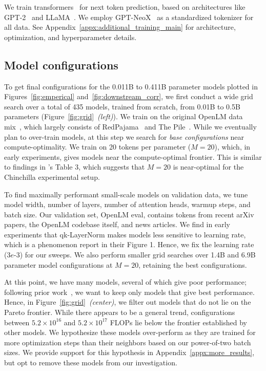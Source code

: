 We train transformers~\cite{transformer} for next token prediction, based on architectures like GPT-2~\cite{Radford2019LanguageMA} and LLaMA~\cite{llama}.
We employ GPT-NeoX~\cite{neox} as a standardized tokenizer for all data.
See Appendix~\ref{appx:additional_training_main} for architecture, optimization, and hyperparameter details.

\subsection{Model configurations}
\label{sec:searching}

To get final configurations for the 0.011B to 0.411B parameter models plotted in Figures~\ref{fig:emperical} and~\ref{fig:downstream_corr}, we first conduct a wide grid search over a total of 435 models, trained from scratch, from 0.01B to 0.5B parameters (Figure~\ref{fig:grid}~\emph{(left)}).
We train on the original OpenLM data mix~\cite{open_lm}, which largely consists of RedPajama~\cite{rpj} and The Pile~\cite{pile}.
While we eventually plan to over-train models, at this step we search for \emph{base configurations} near compute-optimality.
We train on 20 tokens per parameter ($M=20$), which, in early experiments, gives models near the compute-optimal frontier.
This is similar to findings in \citet{chinchilla}'s Table 3, which suggests that $M=20$ is near-optimal for the Chinchilla experimental setup.

To find maximally performant small-scale models on validation data, we tune model width, number of layers, number of attention heads, warmup steps, and batch size.
Our validation set, OpenLM eval, contains tokens from recent arXiv papers, the OpenLM codebase itself, and news articles.
We find in early experiments that qk-LayerNorm makes models less sensitive to learning rate, which is a phenomenon \citet{wortsman2023small} report in their Figure 1.
Hence, we fix the learning rate (3$e$-3) for our sweeps.
We also perform smaller grid searches over 1.4B and 6.9B parameter model configurations at $M=20$, retaining the best configurations.

At this point, we have many models, several of which give poor performance; following prior work~\cite{kaplan2020scaling,chinchilla}, we want to keep only models that give best performance.
Hence, in Figure~\ref{fig:grid}~\emph{(center)}, we filter out models that do not lie on the Pareto frontier.
While there appears to be a general trend, configurations between $5.2 \times 10^{16}$ and $5.2 \times 10^{17}$ FLOPs lie below the frontier established by other models.
We hypothesize these models over-perform as they are trained for more optimization steps than their neighbors based on our power-of-two batch sizes.
We provide support for this hypothesis in Appendix~\ref{appx:more_results}, but opt to remove these models from our investigation.

